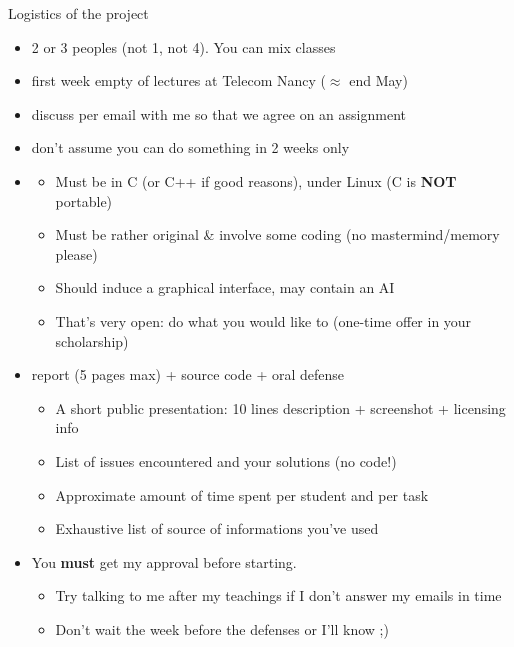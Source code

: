 \begin{frame}{Logistics of the project}
  \begin{itemize}
  \item {} 2 or 3 peoples (not 1, not 4). You can mix classes
  \item {} first week empty of lectures at Telecom Nancy
    ($\approx$ end May)
  \item {} discuss per email with me so that we agree on an assignment
  \item {} don't assume you can do something in 2 weeks only
  \item {}
    \begin{itemize}
    \item Must be in C (or C++ if good reasons), under Linux (C is
      \textbf{NOT} portable)
    \item Must be rather original \& involve some coding %
      {\small(no mastermind/memory please)}
    \item Should induce a graphical interface, may contain an AI
    \item That's very open: do what you would like to (one-time offer in your scholarship)
    \end{itemize}
  \item {} report (5 pages max) + source code + oral defense
    \begin{itemize}
    \item A short public presentation: 10 lines description + screenshot +
      licensing info
    \item List of issues encountered and your solutions (no code!)
    \item Approximate amount of time spent per student and per task
    \item Exhaustive list of source of informations you've used 
    \end{itemize}
  \item   You \textbf{must} get my approval before starting.
    \begin{itemize}
    \item Try talking to me after my teachings if I don't answer my emails in time
    \item Don't wait the week before the defenses or I'll know ;)
    \end{itemize}
  \end{itemize}
\end{frame}